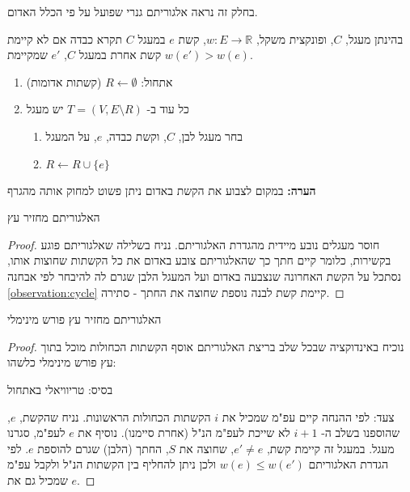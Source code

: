 בחלק זה נראה אלגוריתם גנרי שפועל על פי הכלל האדום.

\begin{definition}
בהינתן מעגל, $C$, ופונקצית משקל, 
$w: E \to \mathbb{R}$,
קשת $e$ במעגל $C$ תקרא כבדה אם לא קיימת קשת אחרת במעגל $C$, 
$e'$
שמקיימת 
$w(e') > w(e)$.
\end{definition}
\begin{enumerate}
\item
אתחול:
$R \leftarrow \emptyset$ 
(קשתות אדומות)
\item
כל עוד ב-%
$T = (V, E \setminus R)$
יש מעגל
\begin{enumerate}
\item
בחר מעגל לבן, $C$, וקשת כבדה, $e$, על המעגל
\item
$R \leftarrow R \cup \{e\}$
\end{enumerate}
\end{enumerate}

\textbf{הערה:}
במקום לצבוע את הקשת באדום ניתן פשוט למחוק אותה מהגרף
\begin{claim}
האלגוריתם מחזיר עץ
\end{claim}
\begin{proof}
חוסר מעגלים נובע מיידית מהגדרת האלגוריתם.
נניח בשלילה שאלגוריתם פוגע בקשירות, כלומר קיים חתך כך שהאלגוריתם צובע באדום את כל הקשתות 
שחוצות אותו, נסתכל על הקשת האחרונה שנצבעה באדום ועל המעגל הלבן שגרם לה להיבחר לפי אבחנה 
\ref{observation:cycle}
קיימת קשת לבנה נוספת שחוצה את החתך - סתירה.
\end{proof}

\begin{claim}
האלגוריתם מחזיר עץ פורש מינימלי
\end{claim}

\begin{proof}
נוכיח באינדוקציה שבכל שלב בריצת האלגוריתם אוסף הקשתות הכחולות מוכל בתוך עץ פורש מינימלי כלשהו:

בסיס: טריוויאלי באתחול

צעד: לפי ההנחה קיים עפ"מ שמכיל את $i$ הקשתות הכחולות הראשונות.
נניח שהקשת, $e$, שהוספנו בשלב ה-%
$i+1$
לא שייכת לעפ"מ הנ"ל (אחרת סיימנו).
נוסיף את $e$ לעפ"מ, סגרנו מעגל.
במעגל זה קיימת קשת,
$e' \neq e$,
שחוצה את $S$, החתך (הלבן) שגרם להוספת $e$.
לפי הגדרת האלגוריתם
$w(e) \leq w(e')$
ולכן ניתן להחליף בין הקשתות הנ"ל ולקבל עפ"מ שמכיל גם את $e$.
\end{proof}


